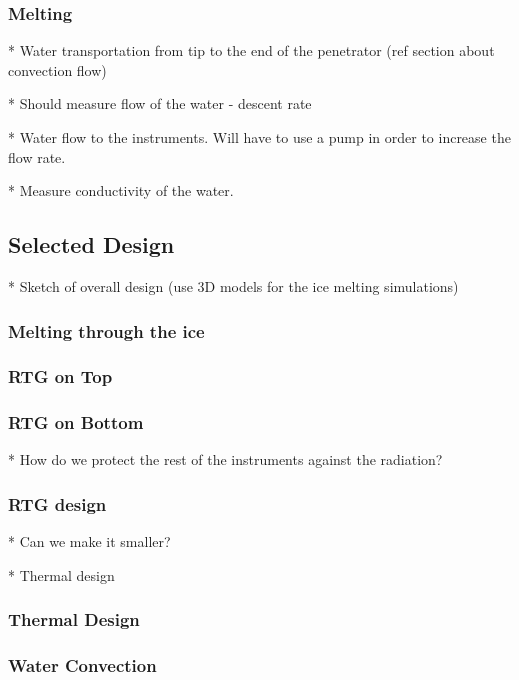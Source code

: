 \documentclass{book}
\begin{document}
\subsubsection{Melting}

* Water transportation from tip to the end of the penetrator (ref section about convection flow)

* Should measure flow of the water - descent rate

* Water flow to the instruments. Will have to use a pump in order to increase the flow rate.

* Measure conductivity of the water.

\subsection{Selected Design}

* Sketch of overall design (use 3D models for the ice melting simulations)

\subsubsection{Melting through the ice} %

\subsubsection{RTG on Top}

\subsubsection{RTG on Bottom}

* How do we protect the rest of the instruments against the radiation?

\subsubsection{RTG design}

* Can we make it smaller?

* Thermal design

\subsubsection{Thermal Design}

\subsubsection{Water Convection}
\end{document}
